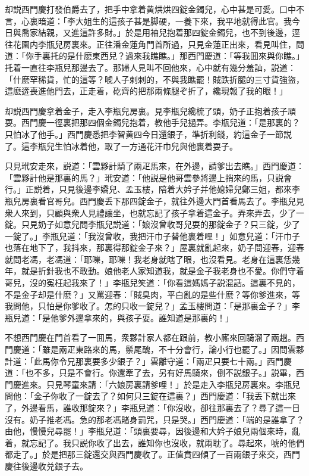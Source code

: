 却説西門慶打發伯爵去了，把手中拿着黄烘烘四錠金鐲兒，心中甚是可愛。口中不言，心裏暗道：「李大姐生的這孩子甚是脚硬，一養下來，我平地就得此官。我今日與喬家結親，又進這許多財。」於是用袖兒抱着那四錠金鐲兒，也不到後邊，逕往花園内李瓶兒房裏來。正往潘金蓮角門首所過，只見金蓮正出來，看見叫住，問道：「你手裏托的是什麽東西兒？過來我瞧瞧。」那西門慶道：「等我囬來與你瞧。」托着一直往李瓶兒那邊去了。那婦人見叫不回他來，心中就有幾分羞訕，説道：「什麽罕稀貨，忙的這等？唬人子剌剌的，不與我瞧罷！賊跌折腿的三寸貨強盜，這麽逩喪進他門去，正走着，矻齊的把那兩條腿ぞ折了，纔現報了我的眼！」

却説西門慶拿着金子，走入李瓶兒房裏。見李瓶兒纔梳了頭，奶子正抱着孩子頑耍。西門慶一徑裏把那四個金鐲兒抱着，教他手兒撾弄。李瓶兒道：「是那裏的？只怕冰了他手。」西門慶悉把李智黄四今日還銀子，準折利錢，約這金子一節説了。這李瓶兒生怕冰着他，取了一方通花汗巾兒與他裹着耍子。

只見玳安走來，説道：「雲夥計騎了兩疋馬來，在外邊，請爹出去瞧。」西門慶道：「雲夥計他是那裏的馬？」玳安道：「他説是他哥雲參將邊上捎來的馬，只説會行。」正説着，只見後邊李嬌兒、孟玉樓，陪着大妗子并他媳婦兒鄭三姐，都來李瓶兒房裏看官哥兒。西門慶丢下那四錠金子，就往外邊大門首看馬去了。李瓶兒見衆人來到，只顧與衆人見禮讓坐，也就忘記了孩子拿着這金子。弄來弄去，少了一錠。只見奶子如意兒問李瓶兒説道：「娘沒曾收哥兒耍的那錠金子？只三錠，少了一錠了。」李瓶兒道：「我沒曾收，我把汗巾子替他裹着哩！」如意兒道：「汗巾子也落在地下了，我抖來，那裏得那錠金子來？」屋裏就亂起來，奶子問迎春，迎春就問老馮，老馮道：「耶嚛，耶嚛！我老身就瞎了眼，也沒看見。老身在這裏恁幾年，就是折針我也不敢動。娘他老人家知道我，就是金子我老身也不愛。你們守着哥兒，沒的寃枉起我來了！」李瓶兒笑道：「你看這媽媽子説混話。這裏不見的，不是金子却是什麽？」又罵迎春：「賊臭肉，平白亂的是些什麽？等你爹進來，等我問他，只怕是你爹收了。怎的只收一錠兒？」孟玉樓問道：「是那裏金子？」李瓶兒道：「是他爹外邊拿來的，與孩子耍。誰知道是那裏的！」

不想西門慶在門首看了一囬馬，衆夥計家人都在跟前，教小廝來回騎溜了兩趟。西門慶道：「雖是兩疋東路來的馬，鬃尾醜，不十分會行，論小行也罷了。」因問雲夥計道：「此馬你令兄那裏要多少銀子？」雲離守道：「兩疋只要七十兩。」西門慶道：「也不多，只是不會行。你還牽了去，另有好馬騎來，倒不説銀子。」説畢，西門慶進來。只見琴童來請：「六娘房裏請爹哩！」於是走入李瓶兒房裏來。李瓶兒問他：「金子你收了一錠去了？如何只三錠在這裏？」西門慶道：「我丢下就出來了，外邊看馬，誰收那錠來？」李瓶兒道：「你沒收，卻往那裏去了？尋了這一日沒有。奶子推老馮。急的那老馮賭身罰咒，只是哭。」西門慶道：「端的是誰拿了？由他，慢慢兒尋罷！」李瓶兒道：「頭裏要尋，因後邊和大妗子娘兒兩個來時，亂着，就忘記了。我只説你收了出去，誰知你也沒收，就兩耽了。尋起來，唬的他們都走了。」於是把那三錠還交與西門慶收了。正值賁四傾了一百兩銀子來交，西門慶往後邊收兑銀子去。

